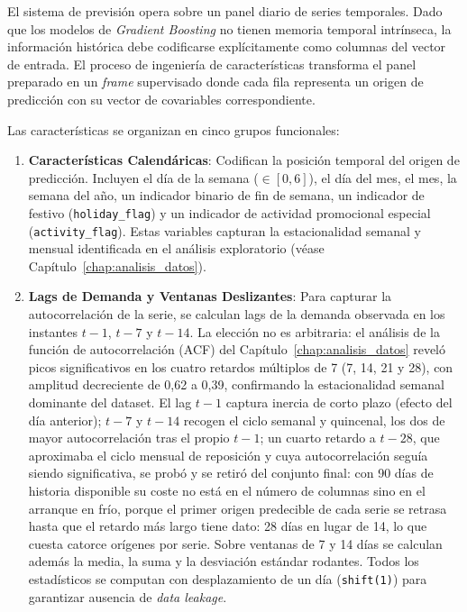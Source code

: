 El sistema de previsión opera sobre un panel diario de series temporales. Dado que los modelos de \textit{Gradient Boosting} no tienen memoria temporal intrínseca, la información histórica debe codificarse explícitamente como columnas del vector de entrada. El proceso de ingeniería de características transforma el panel preparado en un \textit{frame} supervisado donde cada fila representa un origen de predicción con su vector de covariables correspondiente.

Las características se organizan en cinco grupos funcionales:

\begin{enumerate}
    \item \textbf{Características Calendáricas}: Codifican la posición temporal del origen de predicción. Incluyen el día de la semana ($\in [0,6]$), el día del mes, el mes, la semana del año, un indicador binario de fin de semana, un indicador de festivo (\texttt{holiday\_flag}) y un indicador de actividad promocional especial (\texttt{activity\_flag}). Estas variables capturan la estacionalidad semanal y mensual identificada en el análisis exploratorio (véase Capítulo~\ref{chap:analisis_datos}).

    \item \textbf{Lags de Demanda y Ventanas Deslizantes}: Para capturar la autocorrelación de la serie, se calculan lags de la demanda observada en los instantes $t-1$, $t-7$ y $t-14$. La elección no es arbitraria: el análisis de la función de autocorrelación (ACF) del Capítulo~\ref{chap:analisis_datos} reveló picos significativos en los cuatro retardos múltiplos de 7 (7, 14, 21 y 28), con amplitud decreciente de 0,62 a 0,39, confirmando la estacionalidad semanal dominante del dataset. El lag $t-1$ captura inercia de corto plazo (efecto del día anterior); $t-7$ y $t-14$ recogen el ciclo semanal y quincenal, los dos de mayor autocorrelación tras el propio $t-1$; un cuarto retardo a $t-28$, que aproximaba el ciclo mensual de reposición y cuya autocorrelación seguía siendo significativa, se probó y se retiró del conjunto final: con 90 días de historia disponible su coste no está en el número de columnas sino en el arranque en frío, porque el primer origen predecible de cada serie se retrasa hasta que el retardo más largo tiene dato: 28 días en lugar de 14, lo que cuesta catorce orígenes por serie. Sobre ventanas de 7 y 14 días se calculan además la media, la suma y la desviación estándar rodantes. Todos los estadísticos se computan con desplazamiento de un día (\texttt{shift(1)}) para garantizar ausencia de \textit{data leakage}.


\end{enumerate}
